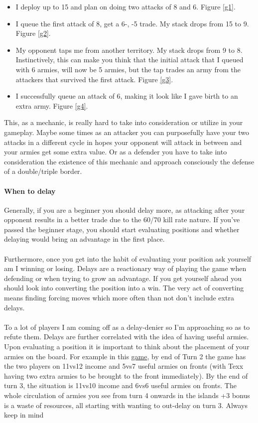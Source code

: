 \begin{itemize}
    \item I deploy up to 15 and plan on doing two attacks of 8 and 6. Figure \ref{g1}.
    \item I queue the first attack of 8, get a 6-, -5 trade. My stack drops from 15 to 9. Figure \ref{g2}.
    \item My opponent taps me from another territory. My stack drops from 9 to 8. Instinctively, this can make you think that the initial attack that I queued with 6 armies, will now be 5 armies, but the tap trades an army from the attackers that survived the first attack. Figure \ref{g3}.
    \item I successfully queue an attack of 6, making it look like I gave birth to an extra army. Figure \ref{g4}.
\end{itemize}

This, as a mechanic, is really hard to take into consideration or utilize in your gameplay. Maybe some times as an attacker you can purposefully have your two attacks in a different cycle in hopes your opponent will attack in between and your armies get some extra value. Or as a defender you have to take into consideration the existence of this mechanic and approach consciously the defense of a double/triple border.

\paragraph{When to delay}

Generally, if you are a beginner you should delay more, as attacking after your opponent results in a better trade due to the 60/70 kill rate nature. If you've passed the beginner stage, you should start evaluating positions and whether delaying would bring an advantage in the first place.
\\
\\
Furthermore, once you get into the habit of evaluating your position ask yourself am I winning or losing. Delays are a reactionary way of playing the game when defending or when trying to grow an advantage. If you get yourself ahead you should look into converting the position into a win. The very act of converting means finding forcing moves which more often than not don't include extra delays.
\\
\\
To a lot of players I am coming off as a delay-denier so I'm approaching so as to refute them. Delays are further correlated with the idea of having useful armies. Upon evaluating a position it is important to think about the placement of your armies on the board. For example in this \href{https://www.warzone.com/MultiPlayer?GameID=38537237}{game}, by end of Turn 2 the game has the two players on 11vs12 income and 5vs7 useful armies on fronts (with Texx having two extra armies to be brought to the front immediately). By the end of turn 3, the situation is 11vs10 income and 6vs6 useful armies on fronts. The whole circulation of armies you see from turn 4 onwards in the islands +3 bonus is a waste of resources, all starting with wanting to out-delay on turn 3. Always keep in mind 

